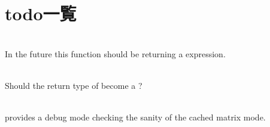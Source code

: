 \chapter{todo一覧}
\hypertarget{todo}{}\label{todo}

\begin{DoxyRefList}
\item[メンバ \doxylink{class_eigen_1_1_transform_a41e2e58b09790eb8e3e220acceb7de1f_a41e2e58b09790eb8e3e220acceb7de1f}{Eigen\+::Transform\texorpdfstring{$<$}{<} \+\_\+\+Scalar, \+\_\+\+Dim, \+\_\+\+Mode, \+\_\+\+Options \texorpdfstring{$>$}{>}\+::Identity} ()]\hfill \\
\label{todo__todo000002}%
%
In the future this function should be returning a  expression.  
\item[メンバ \doxylink{group___geometry___module_ga033d6550c1fc82e232f2b4c380c19a54_ga033d6550c1fc82e232f2b4c380c19a54}{Eigen\+::umeyama} (const Matrix\+Base$<$ Derived $>$ \&src, const Matrix\+Base$<$ Other\+Derived $>$ \&dst, bool with\+\_\+scaling=true)]\hfill \\
\label{todo__todo000003}%
%
Should the return type of  become a ? 
\item[メンバ \doxylink{class_gpu_helper_a52a9ab12d07acbf4ad80737595a9b06e_a52a9ab12d07acbf4ad80737595a9b06e}{Gpu\+Helper\+::force\+Matrix\+Target} (GLenum matrix\+Target)]\hfill \\
\label{todo__todo000001}%
%
provides a debug mode checking the sanity of the cached matrix mode. 
\end{DoxyRefList}